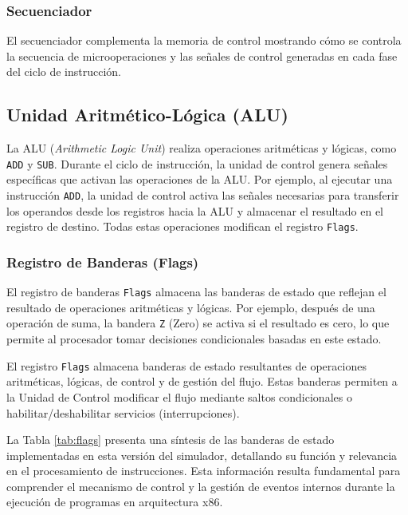 \documentclass[12pt,oneside]{templates/unerthesis}
\begin{document}
\hypertarget{secuenciador}{%
\subsubsection{Secuenciador}\label{secuenciador}}

El secuenciador complementa la memoria de control mostrando cómo se controla la secuencia de microoperaciones y las señales de control generadas en cada fase del ciclo de instrucción.

\hypertarget{unidad-aritmuxe9tico-luxf3gica-alu}{%
\subsection{Unidad Aritmético-Lógica (ALU)}\label{unidad-aritmuxe9tico-luxf3gica-alu}}

La ALU (\emph{Arithmetic Logic Unit}) realiza operaciones aritméticas y lógicas, como \texttt{ADD} y \texttt{SUB}. Durante el ciclo de instrucción, la unidad de control genera señales específicas que activan las operaciones de la ALU. Por ejemplo, al ejecutar una instrucción \texttt{ADD}, la unidad de control activa las señales necesarias para transferir los operandos desde los registros hacia la ALU y almacenar el resultado en el registro de destino. Todas estas operaciones modifican el registro \texttt{Flags}.

\hypertarget{registro-de-banderas-flags}{%
\subsubsection{Registro de Banderas (Flags)}\label{registro-de-banderas-flags}}

El registro de banderas \texttt{Flags} almacena las banderas de estado que reflejan el resultado de operaciones aritméticas y lógicas. Por ejemplo, después de una operación de suma, la bandera \texttt{Z} (Zero) se activa si el resultado es cero, lo que permite al procesador tomar decisiones condicionales basadas en este estado.

El registro \texttt{Flags} almacena banderas de estado resultantes de operaciones aritméticas, lógicas, de control y de gestión del flujo. Estas banderas permiten a la Unidad de Control modificar el flujo mediante saltos condicionales o habilitar/deshabilitar servicios (interrupciones).

La Tabla \ref{tab:flags} presenta una síntesis de las banderas de estado implementadas en esta versión del simulador, detallando su función y relevancia en el procesamiento de instrucciones. Esta información resulta fundamental para comprender el mecanismo de control y la gestión de eventos internos durante la ejecución de programas en arquitectura x86.
\end{document}
